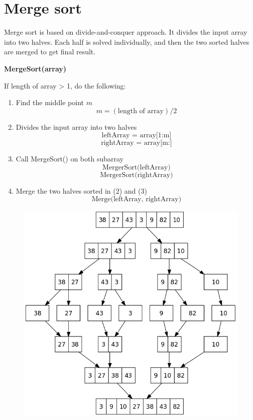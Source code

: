 \documentclass[a4paper,11pt]{book}
\begin{document}
\newpage

\section{Merge sort}

\noindent Merge sort is based on divide-and-conquer approach. It divides the input array into two halves. Each half is solved individually, and then the two sorted halves are merged to get final result.

\vspace{5mm}

\noindent \textbf{MergeSort(array)}
\vspace{3mm}

\noindent If length of array > 1, do the following:
\begin{enumerate}
    \item Find the middle point $m$ 
    $$m = (\text{length of array})/2$$
    \item Divides the input array into two halves
          $$\text{leftArray = array[1:m]}$$
          $$\text{rightArray = array[m:]}$$
    \item Call MergeSort() on both subarray
        $$\text{MergerSort(leftArray)}$$
        $$\text{MergerSort(rightArray)}$$
    \item Merge the two halves sorted in (2) and (3)
        $$ \text{Merge(leftArray, rightArray)}$$
\end{enumerate}

\begin{figure}[ht]
	\centering
	\includegraphics[scale=0.5]{code/sort/pic/mergesort.png}
\end{figure}
\end{document}
